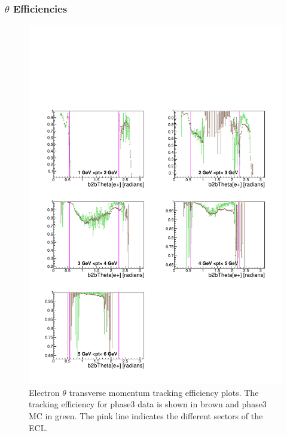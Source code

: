 \documentclass[a4paper,11pt,twosided,final,german,openbib,pdftex,listof=totoc,bibliography=totoc]{scrbook}
\begin{document}
\newpage

\subsubsection{$\theta$ Efficiencies}


\begin{figure}[!htbp]
	\centering
	\includegraphics[width=\textwidth]{Plots/master3/xPtMThetaemP3}
	\caption[Transverse Momentum $\theta$ Electron Efficiency Phase3]{Electron $\theta$ transverse momentum tracking efficiency plots. The tracking efficiency for phase3 data is shown in brown and phase3 MC in green. The pink line indicates the different sectors of the ECL.}
	
	\label{plt:xPtMThetaem3}
\end{figure}
\end{document}
